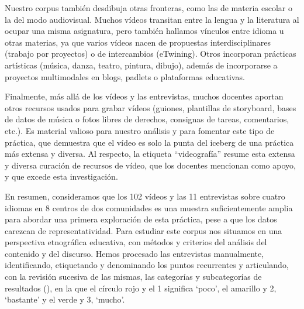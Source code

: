 \documentclass[spanish]{textolivre}
\begin{document}
Nuestro corpus también desdibuja otras fronteras, como las de materia escolar o la del modo audiovisual. Muchos vídeos transitan entre la lengua y la literatura al ocupar una misma asignatura, pero también hallamos vínculos entre idioma u otras materias, ya que varios vídeos nacen de propuestas interdisciplinares (trabajo por proyectos) o de intercambios (eTwining). Otros incorporan prácticas artísticas (música, danza, teatro, pintura, dibujo), además de incorporarse a proyectos multimodales en blogs, padlets o plataformas educativas.

Finalmente, más allá de los vídeos y las entrevistas, muchos docentes aportan otros recursos usados para grabar vídeos (guiones, plantillas de storyboard, bases de datos de música o fotos libres de derechos, consignas de tareas, comentarios, etc.). Es material valioso para nuestro análisis y para fomentar este tipo de práctica, que demuestra que el vídeo es solo la punta del iceberg de una práctica más extensa y diversa. Al respecto, la etiqueta “videografía” resume esta extensa y diversa curación de recursos de vídeo, que los docentes mencionan como apoyo, y que excede esta investigación.

En resumen, consideramos que los 102 vídeos y las 11 entrevistas sobre cuatro idiomas en 8 centros de dos comunidades es una muestra suficientemente amplia para abordar una primera exploración de esta práctica, pese a que los datos carezcan de representatividad. Para estudiar este corpus nos situamos en una perspectiva etnográfica educativa, con métodos y criterios del análisis del contenido y del discurso. Hemos procesado las entrevistas manualmente, identificando, etiquetando y denominando los puntos recurrentes y articulando, con la revisión sucesiva de las mismas, las categorías y subcategorías de resultados (), en la que el círculo rojo y el 1 significa ‘poco’, el amarillo y 2, ‘bastante’ y el verde y 3, ‘mucho’.
\end{document}

